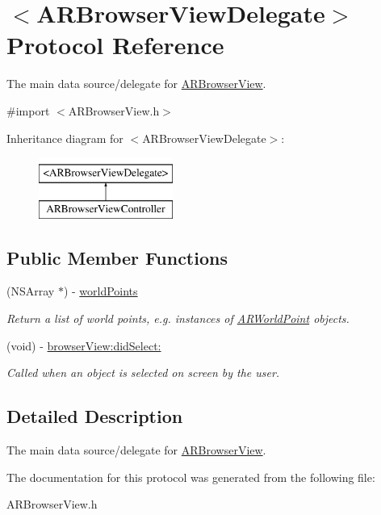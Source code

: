 \hypertarget{protocol_a_r_browser_view_delegate-p}{
\section{$<$ARBrowserViewDelegate$>$ Protocol Reference}
\label{protocol_a_r_browser_view_delegate-p}
}


The main data source/delegate for \hyperlink{interface_a_r_browser_view}{ARBrowserView}.  




{\ttfamily \#import $<$ARBrowserView.h$>$}

Inheritance diagram for $<$ARBrowserViewDelegate$>$:\begin{figure}[H]
\begin{center}
\leavevmode
\includegraphics[height=2.000000cm]{protocol_a_r_browser_view_delegate-p}
\end{center}
\end{figure}
\subsection*{Public Member Functions}
\begin{DoxyCompactItemize}
\item 
\hypertarget{protocol_a_r_browser_view_delegate-p_a52ee75fc0a19b24f804419fc3ab6df43}{
(NSArray $\ast$) -\/ \hyperlink{protocol_a_r_browser_view_delegate-p_a52ee75fc0a19b24f804419fc3ab6df43}{worldPoints}}
\label{protocol_a_r_browser_view_delegate-p_a52ee75fc0a19b24f804419fc3ab6df43}

\begin{DoxyCompactList}\small\item\em Return a list of world points, e.g. instances of \hyperlink{interface_a_r_world_point}{ARWorldPoint} objects. \end{DoxyCompactList}\item 
\hypertarget{protocol_a_r_browser_view_delegate-p_a1cde6bfffaa5d319ce04954867fe909f}{
(void) -\/ \hyperlink{protocol_a_r_browser_view_delegate-p_a1cde6bfffaa5d319ce04954867fe909f}{browserView:didSelect:}}
\label{protocol_a_r_browser_view_delegate-p_a1cde6bfffaa5d319ce04954867fe909f}

\begin{DoxyCompactList}\small\item\em Called when an object is selected on screen by the user. \end{DoxyCompactList}\end{DoxyCompactItemize}


\subsection{Detailed Description}
The main data source/delegate for \hyperlink{interface_a_r_browser_view}{ARBrowserView}. 

The documentation for this protocol was generated from the following file:\begin{DoxyCompactItemize}
\item 
ARBrowserView.h\end{DoxyCompactItemize}

